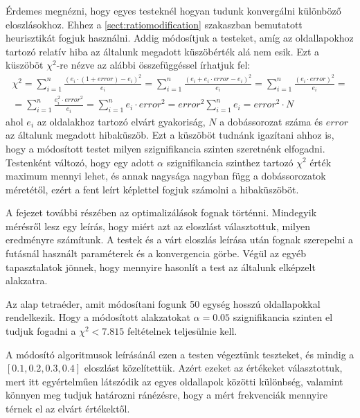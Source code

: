 \label{ch:opt}

Érdemes megnézni, hogy egyes testeknél hogyan tudunk konvergálni különböző eloszlásokhoz.
Ehhez a \ref{sect:ratiomodification} szakaszban bemutatott heurisztikát fogjuk használni.
Addig módosítjuk a testeket, amíg az oldallapokhoz tartozó relatív hiba az általunk megadott küszöbérték alá nem esik.
Ezt a küszöböt $\chi^2$-re nézve az alábbi összefüggéssel írhatjuk fel:
\[
\begin{array}{c}
\chi^2=\sum\limits_{i=1}^{n} \frac{(e_i\cdot (1+error) - e_i)^2}{e_i} = \sum\limits_{i=1}^{n} \frac{(e_i + e_i\cdot error - e_i)^2}{e_i} = \sum\limits_{i=1}^{n} \frac{(e_i\cdot error)^2}{e_i} = \\
= \sum\limits_{i=1}^{n} \frac{e_i^2\cdot error^2}{e_i} = \sum\limits_{i=1}^{n}{e_i\cdot error^2} = error^2 \sum\limits_{i=1}^{n} e_i = error^2 \cdot N
\end{array}
\]
ahol $e_i$ az oldalakhoz tartozó elvárt gyakoriság, $N$ a dobássorozat száma és $error$ az általunk megadott hibaküszöb.
Ezt a küszöböt tudnánk igazítani ahhoz is, hogy a módosított testet milyen szignifikancia szinten szeretnénk elfogadni.
Testenként változó, hogy egy adott $\alpha$ szignifikancia szinthez tartozó  $\chi^2$ érték maximum mennyi lehet, és annak nagysága nagyban függ a dobássorozatok méretétől, ezért a fent leírt képlettel fogjuk számolni a hibaküszöböt.

A fejezet további részében az optimalizálások fognak történni.
Mindegyik mérésről lesz egy leírás, hogy miért azt az eloszlást választottuk, milyen eredményre számítunk.
A testek és a várt eloszlás leírása után fognak szerepelni a futásnál használt paraméterek és a konvergencia görbe.
Végül az egyéb tapasztalatok jönnek, hogy mennyire hasonlít a test az általunk elképzelt alakzatra.


Az alap tetraéder, amit módosítani fogunk 50 egység hosszú oldallapokkal rendelkezik.
Hogy a módosított alakzatokat $\alpha = 0.05$ szignifikancia szinten el tudjuk fogadni a $\chi^2 < 7.815$ feltételnek teljesülnie kell.

A módosító algoritmusok leírásánál ezen a testen végeztünk teszteket, és mindig a $[0.1, 0.2, 0.3, 0.4]$ eloszlást közelítettük.
Azért ezeket az értékeket választottuk, mert itt egyértelműen látszódik az egyes oldallapok közötti különbség, valamint könnyen meg tudjuk határozni ránézésre, hogy a mért frekvenciák mennyire térnek el az elvárt értékektől.


